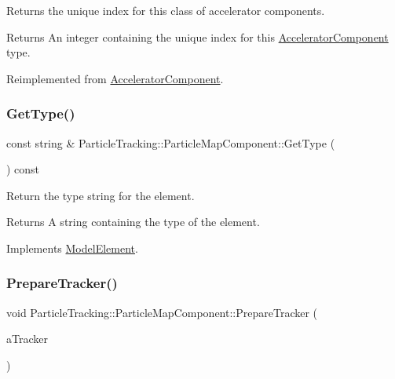 Returns the unique index for this class of accelerator components. \begin{DoxyReturn}{Returns}
An integer containing the unique index for this \hyperlink{classAcceleratorComponent}{Accelerator\+Component} type. 
\end{DoxyReturn}


Reimplemented from \hyperlink{classAcceleratorComponent_abd1490171ac9af6004d3da01fb3b95fb}{Accelerator\+Component}.

\mbox{\label{classParticleTracking_1_1ParticleMapComponent_ac16294b88ccb64111e35174e2c369b88}} 
\subsubsection{\texorpdfstring{Get\+Type()}{GetType()}}
{\footnotesize\ttfamily const string \& Particle\+Tracking\+::\+Particle\+Map\+Component\+::\+Get\+Type (\begin{DoxyParamCaption}{ }\end{DoxyParamCaption}) const\hspace{0.3cm}{\ttfamily [virtual]}}

Return the type string for the element. \begin{DoxyReturn}{Returns}
A string containing the type of the element. 
\end{DoxyReturn}


Implements \hyperlink{classModelElement_a04dc2e51e1999fca612eb1838ec6b271}{Model\+Element}.

\mbox{\label{classParticleTracking_1_1ParticleMapComponent_a3490b4f7e961c402ce7eb42ab4e080d7}} 
\subsubsection{\texorpdfstring{Prepare\+Tracker()}{PrepareTracker()}}
{\footnotesize\ttfamily void Particle\+Tracking\+::\+Particle\+Map\+Component\+::\+Prepare\+Tracker (\begin{DoxyParamCaption}\item[{\hyperlink{classComponentTracker}{Component\+Tracker} \&}]{a\+Tracker }\end{DoxyParamCaption})\hspace{0.3cm}{\ttfamily [virtual]}}

